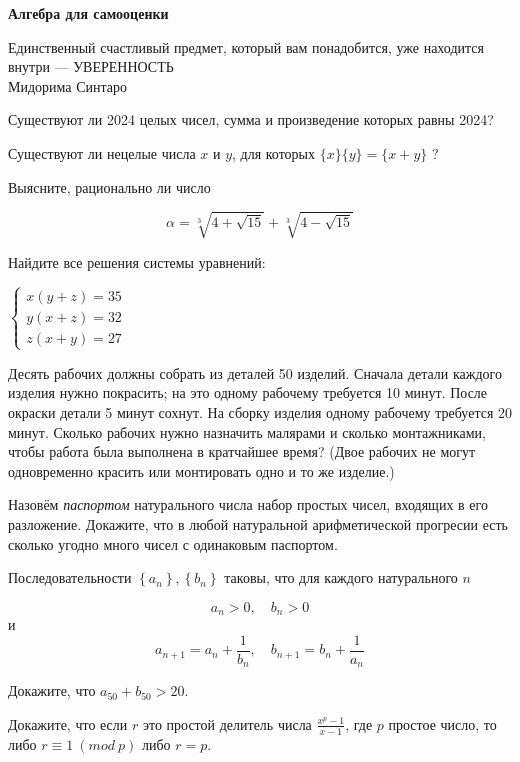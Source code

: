 \centerline{\bf \Huge Алгебра для самооценки}

\begin{flushright}
        \scriptsize{Единственный счастливый предмет, который вам понадобится, уже находится внутри — УВЕРЕННОСТЬ\\ Мидорима Синтаро}
\end{flushright}

Существуют ли 2024 целых чисел, сумма и произведение которых равны 2024?

Существуют ли нецелые числа $x$ и $y$, для которых $\{x\}\{y\}=\{x+y\}$ ?

Выясните, рационально ли число

$$
\alpha=\sqrt[3]{4+\sqrt{15}}+\sqrt[3]{4-\sqrt{15}}
$$

 Найдите все решения системы уравнений:

$\left\{\begin{array}{l}
    x(y+z)=35 \\ 
    y(x+z)=32 \\ 
    z(x+y)=27
    \end{array}\right.$

Десять рабочих должны собрать из деталей 50 изделий. Сначала детали каждого изделия нужно покрасить; на это одному рабочему требуется 10 минут. После окраски детали 5 минут сохнут. На сборку изделия одному рабочему требуется 20 минут. Сколько рабочих нужно назначить малярами и сколько монтажниками, чтобы работа была выполнена в кратчайшее время? (Двое рабочих не могут одновременно красить или монтировать одно и то же изделие.)


Назовём \textit{паспортом} натурального числа набор простых чисел, входящих в его разложение. Докажите, что в любой натуральной арифметической прогресии есть сколько угодно много чисел с одинаковым паспортом.

Последовательности $\left\{a_n\right\},\left\{b_n\right\}$ таковы, что для каждого натурального $n$

$$
a_n>0, \quad b_n>0
$$
и
$$
a_{n+1}=a_n+\frac{1}{b_n}, \quad b_{n+1}=b_n+\frac{1}{a_n}
$$


Докажите, что $a_{50}+b_{50}>20$.


Докажите, что если $r$ это простой делитель числа $\frac{x^p-1}{x-1}$, где $p$ простое число, то либо $r \equiv 1\ (mod\  p)$ либо $r=p$.